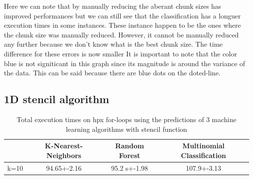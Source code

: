 \documentclass[12pt]{article}
\begin{document}
Here we can note that by manually reducing the aberant chunk sizes has improved performances but we can still see that the classification has  a longuer execution times in some instances. These instance happen to be the ones where the chunk size was manually reduced. However, it cannot be manually reduced any further because we don't know what is the best chunk size. The time difference for these errors is now smaller It is important to note that the color blue is not signiticant in this graph since its magnitude is around the variance of the data. This can be said because there are blue dots on the doted-line.
\subsection{1D stencil algorithm}

\begin{table}[h]
	\centering
	\caption{Total execution times on hpx for-loops using the predictions of 3 machine learning algorithms with stencil function}
	\label{my-label}
	\begin{tabular}{|c|c|c|c|}
		\hline
		& K-Nearest-Neighbors & Random Forest &Multinomial Classification\\ \hline
		k=10 & 94.65+-2.16  & 95.2 s+-1.98 & 107.9+-3.13\\ \hline
	\end{tabular}
\end{table}
\end{document}
